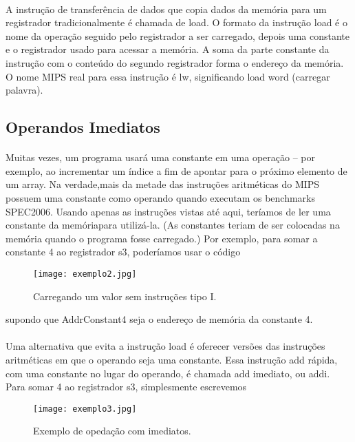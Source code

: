 \documentclass[12pt]{article}
\begin{document}
    \paragraph{}
    A instrução de transferência de dados que copia dados da memória para um registrador tradicionalmente é chamada de load. O formato da instrução load é o nome da operação seguido pelo registrador a ser carregado, depois uma constante e o registrador usado para acessar a memória. A soma da parte constante da instrução com o conteúdo do segundo registrador forma o endereço da memória. O nome MIPS real para essa instrução é lw, significando load word (carregar palavra).
\subsection{Operandos Imediatos}
    \paragraph{}
    Muitas vezes, um programa usará uma constante em uma operação – por exemplo, ao incrementar um índice a fim de apontar para o próximo elemento de um array. Na verdade,mais da metade das instruções aritméticas do MIPS possuem uma constante como operando quando executam os benchmarks SPEC2006. Usando apenas as instruções vistas até aqui, teríamos de ler uma constante da memóriapara utilizá-la. (As constantes teriam de ser colocadas na memória quando o programa fosse carregado.) Por exemplo, para somar a constante 4 ao registrador s3, poderíamos usar o código
    
\begin{figure}[h!]
    \texttt{[image: exemplo2.jpg]}
    \caption{Carregando um valor sem instruções tipo I.}
    \label{fig:memoria}
\end{figure}

    supondo que AddrConstant4 seja o endereço de memória da constante 4.
    \paragraph{}
    Uma alternativa que evita a instrução load é oferecer versões das instruções aritméticas em que o operando seja uma constante. Essa instrução add rápida, com uma constante no lugar do operando, é chamada add imediato, ou addi. Para somar 4 ao registrador s3, simplesmente escrevemos
    
\begin{figure}[h!]
    \texttt{[image: exemplo3.jpg]}
    \caption{Exemplo de opedação com imediatos.}
    \label{fig:memoria}
\end{figure}
\end{document}
